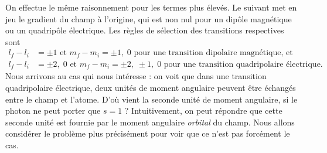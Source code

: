 On effectue le même raisonnement pour les termes plus élevés. Le suivant met en jeu le gradient du champ à l'origine, qui est non nul pour un dipôle magnétique ou un quadripôle électrique. Les règles de sélection des transitions respectives sont 
\begin{align*}
l_f-l_i&=\pm1\text{ et }m_f-m_i=\pm1,\;0\text{ pour une transition dipolaire magnétique, et}\\
l_f-l_i&=\pm2,\;0\text{ et }m_f-m_i=\pm2,\;\pm1,\;0\text{ pour une transition quadripolaire électrique.}
\end{align*}
Nous arrivons au cas qui nous intéresse : on voit que dans une transition quadripolaire électrique, deux unités de moment angulaire peuvent être échangés entre le champ et l'atome. D'où vient la seconde unité de moment angulaire, si le photon ne peut porter que $s=1$ ? Intuitivement, on peut répondre que cette seconde unité est fournie par le moment angulaire \textit{orbital} du champ. Nous allons considérer le problème plus précisément pour voir que ce n'est pas forcément le cas.

